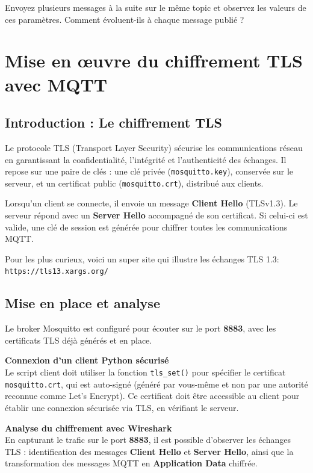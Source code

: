 \documentclass{article}
\begin{document}
Envoyez plusieurs messages à la suite sur le même topic et observez les valeurs de ces paramètres. Comment évoluent-ils à chaque message publié ?

\section{Mise en œuvre du chiffrement TLS avec MQTT}

\subsection{Introduction : Le chiffrement TLS}

Le protocole TLS (Transport Layer Security) sécurise les communications réseau en garantissant la confidentialité, l'intégrité et l'authenticité des échanges. Il repose sur une paire de clés : une clé privée (\texttt{mosquitto.key}), conservée sur le serveur, et un certificat public (\texttt{mosquitto.crt}), distribué aux clients.

Lorsqu'un client se connecte, il envoie un message \textbf{Client Hello} (TLSv1.3). Le serveur répond avec un \textbf{Server Hello} accompagné de son certificat. Si celui-ci est valide, une clé de session est générée pour chiffrer toutes les communications MQTT.

Pour les plus curieux, voici un super site qui illustre les échanges TLS 1.3: \texttt{https://tls13.xargs.org/}

\subsection{Mise en place et analyse}

Le broker Mosquitto est configuré pour écouter sur le port \textbf{8883}, avec les certificats TLS déjà générés et en place.

\bigskip
\noindent
\textbf{Connexion d'un client Python sécurisé} \\
Le script client doit utiliser la fonction \texttt{tls\_set()} pour spécifier le certificat \texttt{mosquitto.crt}, qui est auto-signé (généré par vous-même et non par une autorité reconnue comme Let's Encrypt). Ce certificat doit être accessible au client pour établir une connexion sécurisée via TLS, en vérifiant le serveur.

\bigskip
\noindent
\textbf{Analyse du chiffrement avec Wireshark} \\
En capturant le trafic sur le port \textbf{8883}, il est possible d'observer les échanges TLS : identification des messages \textbf{Client Hello} et \textbf{Server Hello}, ainsi que la transformation des messages MQTT en \textbf{Application Data} chiffrée.
\end{document}
